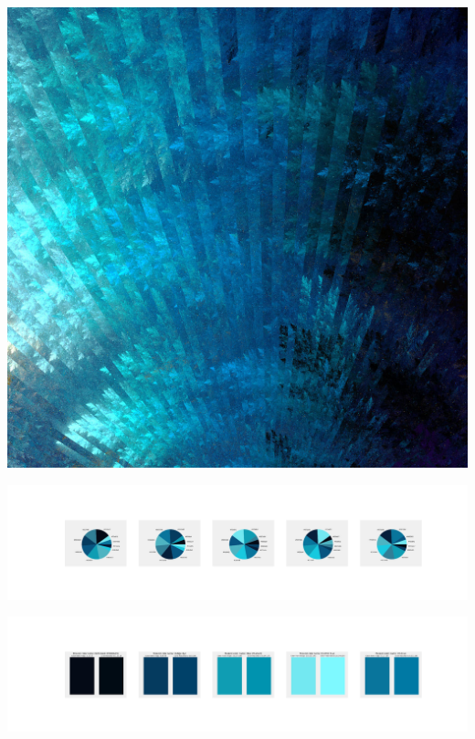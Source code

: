 \documentclass[11pt]{article}
\begin{document}
\begin{landscape}
    \begin{center}
    \includegraphics[width=\textwidth]{./nbimg/file (298).jpg}
    \end{center}

    \begin{center}
    \includegraphics[width=250mm]{./nbimg/pie-220.jpg}
    \end{center}

    \begin{center}
    \includegraphics[width=250mm]{./nbimg/peak-220.jpg}
    \end{center}
    


\end{landscape}
\end{document}

